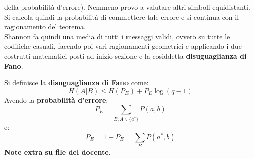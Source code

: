 \documentclass[a4paper,12pt, oneside]{book}
\begin{document}
della probabilità d'errore). Nemmeno provo a valutare altri simboli
equidistanti. Si calcola quindi la probabilità di commettere tale errore e si
continua con il ragionamento del teorema.\\
Shannon fa quindi una media di tutti i messaggi validi, ovvero su tutte le
codifiche casuali, facendo poi vari ragionamenti geometrici e applicando i due
costrutti matematici posti ad inizio sezione e la cosiddetta
\textbf{disuguaglianza di Fano}.
\begin{definizione}
  Si definisce la \textbf{disuguaglianza di Fano} come:
  \[H(A|B)\leq H(P_E)+P_E\log(q-1)\]
  Avendo la \textbf{probabilità d'errore}:
  \[P_E=\sum_{B,A\backslash\{a^{*}\}}P(a,b)\]
  e:
  \[\overline{P_E}=1-P_E=\sum_{B}P(a^{*},b)\]
  \textbf{Note extra su file del docente}.
\end{definizione}
\end{document}
